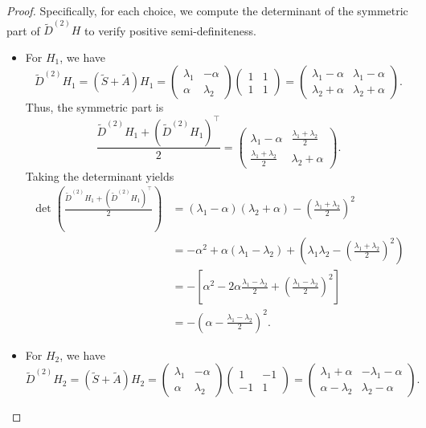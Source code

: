 \documentclass[twoside,11pt]{article}
\begin{document}
\begin{proof}
  Specifically, for each choice, we compute the determinant of the symmetric part of $\tilde{D}^{(2)}H$ to verify positive semi-definiteness.
  \begin{itemize}
    \item[(1)] For $H_1$, we have
      \[
        \tilde{D}^{(2)} H_1 = (\tilde{S} + \tilde{A}) H_1
        =
        \begin{pmatrix}
          \lambda_1 & -\alpha \\
          \alpha & \lambda_2
        \end{pmatrix}
        \begin{pmatrix}
          1 & 1 \\
          1 & 1
        \end{pmatrix}
        =
        \begin{pmatrix}
          \lambda_1 - \alpha & \lambda_1 - \alpha \\
          \lambda_2 + \alpha & \lambda_2 + \alpha
        \end{pmatrix}.
      \]
      Thus, the symmetric part is
      \[
        \frac{\tilde{D}^{(2)}H_1 + (\tilde{D}^{(2)}H_1)^{\intercal}}{2}
        =
        \begin{pmatrix}
          \lambda_1 - \alpha & \frac{\lambda_1 + \lambda_2}{2} \\
          \frac{\lambda_1 + \lambda_2}{2} & \lambda_2 + \alpha
        \end{pmatrix}.
      \]
      Taking the determinant yields
      \begin{align*}
        \det\left(\frac{\tilde{D}^{(2)}H_1 + (\tilde{D}^{(2)}H_1)^{\intercal}}{2}\right)
        &= (\lambda_1 - \alpha)(\lambda_2 + \alpha) - \left(\frac{\lambda_1 + \lambda_2}{2}\right)^2 \\
        &= - \alpha^2 + \alpha(\lambda_1 - \lambda_2) + \left(\lambda_1\lambda_2 - \left(\frac{\lambda_1 + \lambda_2}{2}\right)^2\right) \\
        &= -\left[\alpha^2 - 2\alpha \frac{\lambda_1 - \lambda_2}{2} + \left(\frac{\lambda_1 - \lambda_2}{2}\right)^2\right]\\
        &= -\left(\alpha - \frac{\lambda_1 - \lambda_2}{2}\right)^2.
      \end{align*}

    \item[(2)] For $H_2$, we have
      \[
        \tilde{D}^{(2)} H_2 = (\tilde{S} + \tilde{A}) H_2
        =
        \begin{pmatrix}
          \lambda_1 & -\alpha \\
          \alpha & \lambda_2
        \end{pmatrix}
        \begin{pmatrix}
          1 & -1 \\
          -1 & 1
        \end{pmatrix}
        =
        \begin{pmatrix}
          \lambda_1 + \alpha & -\lambda_1 - \alpha \\
          \alpha - \lambda_2 & \lambda_2 - \alpha
        \end{pmatrix}.
      \]


\end{itemize}
\end{proof}
\end{document}
